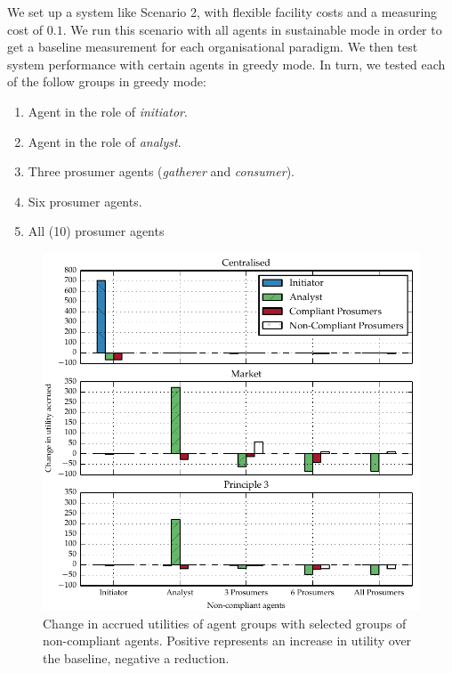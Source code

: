 We set up a system like Scenario 2, with flexible facility costs and a
measuring cost of $0.1$. We run this scenario with all agents in sustainable
mode in order to get a baseline measurement for each organisational paradigm.
We then test system performance with certain agents in greedy mode.
In turn, we tested each of the follow groups in greedy mode:

\begin{enumerate}
\item Agent in the role of \emph{initiator}.
\item Agent in the role of \emph{analyst}.
\item Three prosumer agents (\emph{gatherer} and \emph{consumer}).
\item Six prosumer agents.
\item All (10) prosumer agents
\end{enumerate}

\begin{figure}
\includegraphics{gfx/kc/powerbar.pdf} 
\caption[Change in accrued utilities of agent groups with selected groups of non-compliant agents.]{Change in accrued utilities of agent groups with selected groups of non-compliant agents. Positive represents an increase in utility over the baseline, negative a reduction.}\label{fig:powerbar}
\end{figure}

